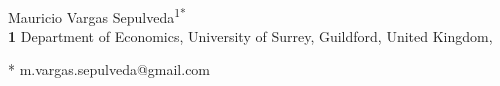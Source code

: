 \documentclass[
  10pt,
  letterpaper,
]{article}
\begin{document}
\vspace*{0.2in}

\begin{flushleft}
{\Large
\textbf{} %
}
\newline
\\
Mauricio Vargas Sepulveda\textsuperscript{1*}
\\
\bigskip
\textbf{1} Department of Economics, University of
Surrey, Guildford, United Kingdom, 
\bigskip

% 
%





* m.vargas.sepulveda@gmail.com

\end{flushleft}
\end{document}
